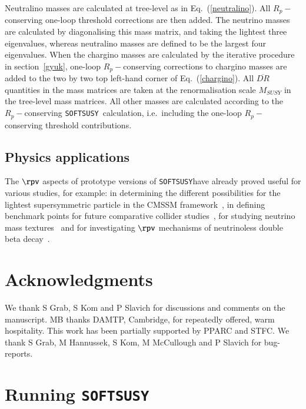 \documentclass[final,3p,times,pdflatex]{elsarticle}
\def\SOFTSUSY{{\tt SOFTSUSY}}
\begin{document}
Neutralino masses are calculated at tree-level as in Eq.~(\ref{neutralino}). 
All $R_p-$conserving one-loop threshold corrections are then added. The
neutrino masses are calculated by diagonalising this 
mass matrix, and taking the lightest three eigenvalues, whereas neutralino
masses are defined to be the largest four eigenvalues. 
When the chargino masses are calculated by the iterative procedure in
section~\ref{gyuk}, one-loop $R_p-$conserving corrections to
chargino masses are added to the two by two top left-hand corner of
Eq.~(\ref{chargino}). 
All $\overline{DR}$ quantities in the mass matrices are taken at the
renormalisation scale
$M_{SUSY}$ in the tree-level mass matrices.  All other
masses are calculated according to the $R_p-$conserving \SOFTSUSY~calculation,
i.e.\ including the one-loop $R_p-$conserving threshold contributions.

\subsection{Physics applications}
The $\rpv$ aspects of prototype versions of \SOFTSUSY have already proved
useful for various 
studies, for example: in determining the different possibilities for the lightest
supersymmetric particle in the CMSSM
framework~\cite{Dreiner:2008ca,Bernhardt:2008jz}, in defining benchmark points
for future comparative collider studies~\cite{Allanach:2006st}, for studying
neutrino mass textures~\cite{Allanach:2007qc} and for investigating $\rpv$
mechanisms of neutrinoless double beta
decay~\cite{Allanach:2009iv,Allanach:2009xx}. 

\section*{Acknowledgments}
We thank S Grab, S Kom and P Slavich for discussions and 
comments on the manuscript.
MB thanks DAMTP, Cambridge, for repeatedly
offered, warm hospitality. This work has been partially supported by PPARC and
STFC\@. We thank S Grab, M Hannussek, S Kom, M McCullough and P Slavich for
bug-reports. 


\appendix

\section{Running \SOFTSUSY}
\label{sec:run}
\end{document}
